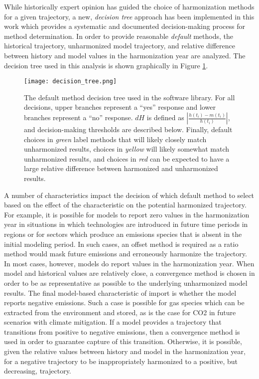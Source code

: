 While historically expert opinion has guided the choice of harmonization methods
for a given trajectory, a new, \textit{decision tree} approach has been
implemented in this work which provides a systematic and documented
decision-making process for method determination. In order to provide reasonable
\textit{default} methods, the historical trajectory, unharmonized model
trajectory, and relative difference between history and model values in the
harmonization year are analyzed. The decision tree used in this analysis is
shown graphically in Figure \ref{fig:decision_tree}.


\begin{figure}
  \begin{center}
    \texttt{[image: decision\_tree.png]}
    \caption[]{
      \label{fig:decision_tree}
      The default method decision tree used in the  software
      library. For all decisions, upper branches represent a ``yes'' response
      and lower branches represent a ``no'' response. $dH$ is defined as
      $\left|\frac{h(t_i) - m(t_i)}{h(t_i)}\right|$, and decision-making
      thresholds are described below. Finally, default choices in \textit{green}
      label methods that will likely closely match unharmonized results, choices
      in \textit{yellow} will likely somewhat match unharmonized results, and
      choices in \textit{red} can be expected to have a large relative
      difference between harmonized and unharmonized results.}
  \end{center}
\end{figure}

A number of characteristics impact the decision of which default method to
select based on the effect of the characteristic on the potential harmonized
trajectory. For example, it is possible for models to report zero values in the
harmonization year in situations in which technologies are introduced in future
time periods in regions or for sectors which produce an emissions species that
is absent in the initial modeling period. In such cases, an offset method is
required as a ratio method would mask future emissions and erroneously harmonize
the trajectory. In most cases, however, models do report values in the
harmonization year. When model and historical values are relatively close, a
convergence method is chosen in order to be as representative as possible to the
underlying unharmonized model results. The final model-based characteristic of
import is whether the model reports negative emissions. Such a case is possible
for gas species which can be extracted from the environment and stored, as is
the case for CO2 in future scenarios with climate mitigation. If a model
% 
% 
provides a trajectory that transitions from positive to negative emissions, then
a convergence method is used in order to guarantee capture of this
transition. Otherwise, it is possible, given the relative values between history
and model in the harmonization year, for a negative trajectory to be
inappropriately harmonized to a positive, but decreasing, trajectory.

